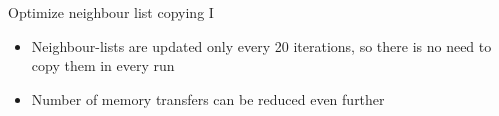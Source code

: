 \documentclass[12pt,xcolor={rgb},t]{beamer}
\begin{document}
\begin{frame}[fragile]{Optimize neighbour list copying I}

    \begin{itemize}
        \item Neighbour-lists are updated only every 20 iterations, so there is no need to copy them in every run
        \item Number of memory transfers can be reduced even further
        \vspace*{1em}
        \begin{figure}[!H]
            \centering
        \end{figure}
    \end{itemize}

\end{frame}
\end{document}

